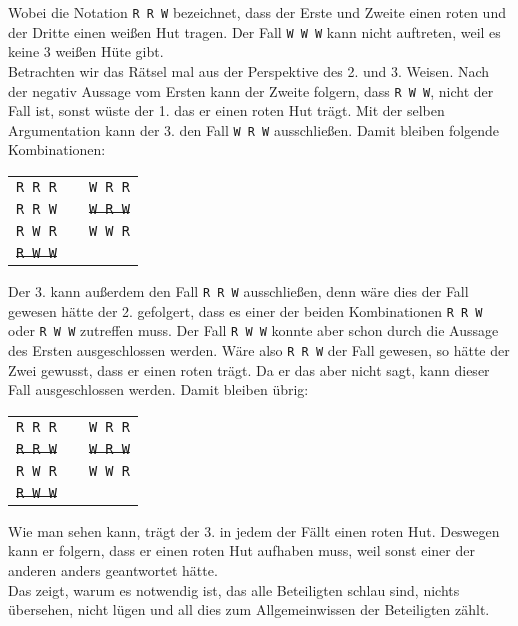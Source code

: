 %
Wobei die Notation \texttt{R R W} bezeichnet, dass der Erste und Zweite einen roten und der Dritte einen weißen Hut tragen.
Der Fall \texttt{W W W} kann nicht auftreten, weil es keine 3 weißen Hüte gibt.\\
Betrachten wir das Rätsel mal aus der Perspektive des 2. und 3. Weisen. 
Nach der negativ Aussage vom Ersten kann der Zweite folgern, dass \texttt{R W W}, nicht der Fall ist, sonst wüste der 1. das er einen roten Hut trägt. 
Mit der selben Argumentation kann der 3. den Fall \texttt{W R W} ausschließen. 
Damit bleiben folgende Kombinationen:\\
\begin{tabular}{ccc}
\texttt{R R R} &   & \texttt{W R R}\\
\texttt{R R W} &   & \sout{\texttt{W R W}}\\
\texttt{R W R} &   & \texttt{W W R}\\
\sout{\texttt{R W W}} &   &   \\
\end{tabular}
%
Der 3. kann außerdem den Fall \texttt{R R W} ausschließen, denn wäre dies der Fall gewesen hätte der 2. gefolgert, dass es einer der beiden Kombinationen \texttt{R R W} oder \texttt{R W W} zutreffen muss.
Der Fall \texttt{R W W} konnte aber schon durch die Aussage des Ersten ausgeschlossen werden.
Wäre also \texttt{R R W} der Fall gewesen, so hätte der Zwei gewusst, dass er einen roten trägt. Da er das aber nicht sagt, kann dieser Fall ausgeschlossen werden.
Damit bleiben übrig:\\
%
\begin{tabular}{ccc}
\texttt{R R R} &   & \texttt{W R R}\\
\sout{\texttt{R R W}} &   & \sout{\texttt{W R W}}\\
\texttt{R W R} &   & \texttt{W W R}\\
\sout{\texttt{R W W}} &   &   \\
\end{tabular}
Wie man sehen kann, trägt der 3. in jedem der Fällt einen roten Hut.
Deswegen kann er folgern, dass er einen roten Hut aufhaben muss, weil sonst einer der anderen anders geantwortet hätte.\\
Das zeigt, warum es notwendig ist, das alle Beteiligten schlau sind, nichts übersehen, nicht lügen und all dies zum Allgemeinwissen der Beteiligten zählt.




